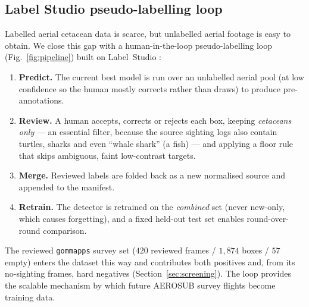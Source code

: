 \documentclass[11pt,a4paper]{article}
\begin{document}
\subsection{Label Studio pseudo-labelling loop}\label{sec:labelstudio}
Labelled aerial cetacean data is scarce, but unlabelled aerial footage is easy
to obtain. We close this gap with a human-in-the-loop pseudo-labelling loop
(Fig.~\ref{fig:pipeline}) built on Label~Studio \citep{labelstudio}:
\begin{enumerate}[itemsep=2pt,topsep=2pt]
  \item \textbf{Predict.} The current best model is run over an unlabelled
  aerial pool (at low confidence so the human mostly corrects rather than draws)
  to produce pre-annotations.
  \item \textbf{Review.} A human accepts, corrects or rejects each box, keeping
  \emph{cetaceans only} --- an essential filter, because the source sighting
  logs also contain turtles, sharks and even ``whale shark'' (a fish) --- and
  applying a floor rule that skips ambiguous, faint low-contrast targets.
  \item \textbf{Merge.} Reviewed labels are folded back as a new normalised
  source and appended to the manifest.
  \item \textbf{Retrain.} The detector is retrained on the \emph{combined} set
  (never new-only, which causes forgetting), and a fixed held-out test set
  enables round-over-round comparison.
\end{enumerate}
The reviewed \texttt{gommapps} survey set ($420$ reviewed frames / $1{,}874$
boxes / $57$ empty) enters the dataset this way and contributes both positives
and, from its no-sighting frames, hard negatives (Section~\ref{sec:screening}).
The loop provides the scalable mechanism by which future AEROSUB survey flights
become training data.
\end{document}
